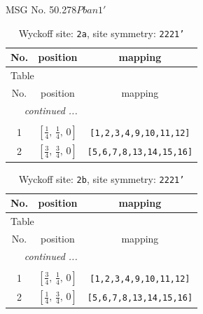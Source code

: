 \documentclass[fleqn,8pt]{jsarticle}
\begin{document}
\setcounter{MaxMatrixCols}{32}

\renewcommand{\tablename}{Table~}
\renewcommand{\figurename}{Figure~}
\begin{center}
\LARGE
MSG No. 50.278\quad$Pban1'$
\end{center}
\renewcommand{\arraystretch}{1.2}
\begin{longtable}{ccc}
\caption{Wyckoff site: {\tt 2a}, site symmetry: {\tt 2221'}}
 \\
 \hline \hline
No. & position & mapping \\ \hline \endfirsthead

\multicolumn{2}{l}{\tablename\ \thetable{}} \\
 \hline \hline
No. & position & mapping \\ \hline \endhead

 \hline \hline
\multicolumn{2}{r}{\footnotesize\it continued ...} \\ \endfoot

 \hline \hline
\multicolumn{2}{r}{} \\ \endlastfoot

1 & $\left[ \frac{1}{4},\, \frac{1}{4},\, 0 \right]$ & {\tt [1,2,3,4,9,10,11,12]} \\ \hline
2 & $\left[ \frac{3}{4},\, \frac{3}{4},\, 0 \right]$ & {\tt [5,6,7,8,13,14,15,16]} \\
\end{longtable}
\renewcommand{\arraystretch}{1.2}
\begin{longtable}{ccc}
\caption{Wyckoff site: {\tt 2b}, site symmetry: {\tt 2221'}}
 \\
 \hline \hline
No. & position & mapping \\ \hline \endfirsthead

\multicolumn{2}{l}{\tablename\ \thetable{}} \\
 \hline \hline
No. & position & mapping \\ \hline \endhead

 \hline \hline
\multicolumn{2}{r}{\footnotesize\it continued ...} \\ \endfoot

 \hline \hline
\multicolumn{2}{r}{} \\ \endlastfoot

1 & $\left[ \frac{3}{4},\, \frac{1}{4},\, 0 \right]$ & {\tt [1,2,3,4,9,10,11,12]} \\ \hline
2 & $\left[ \frac{1}{4},\, \frac{3}{4},\, 0 \right]$ & {\tt [5,6,7,8,13,14,15,16]} \\
\end{longtable}
\end{document}
